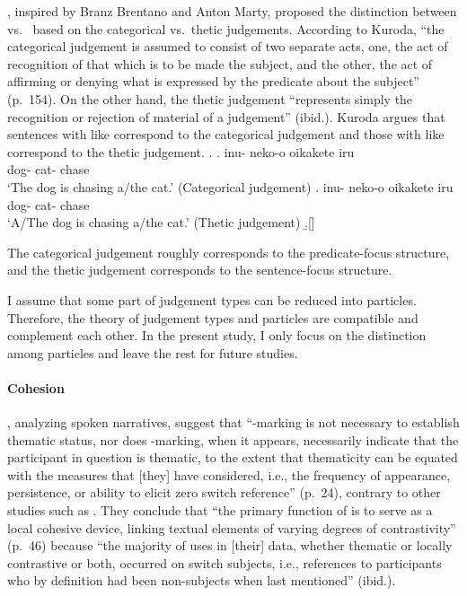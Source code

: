 ,
inspired by Branz Brentano and Anton Marty,
proposed the distinction between  vs.~
based on the categorical vs.~thetic judgements.
According to Kuroda,
``the categorical judgement is assumed to consist of two separate acts,
one, the act of recognition of that which is to be made the subject,
and the other, the act of affirming or denying what is expressed by the predicate about the subject'' (p.~154).
On the other hand,
the thetic judgement ``represents simply the recognition or rejection of material of a judgement'' (ibid.).
Kuroda argues that
sentences with  like \Next[a] correspond to the categorical judgement and
those with  like \Next[b] correspond to the thetic judgement.
%
\ex.
 \ag. inu- neko-o oikakete iru \\
      dog- cat- chase  \\
      `The dog is chasing a/the cat.'
      \hfill{(Categorical judgement)}
 \bg. inu- neko-o oikakete iru \\
      dog- cat- chase  \\
      `A/The dog is chasing a/the cat.'
      \hfill{(Thetic judgement)}
 \b.[] \hfill{\cite[161]{kuroda72}}

The categorical judgement roughly corresponds to the predicate-focus structure, and
the thetic judgement corresponds to the sentence-focus structure.

I assume that some part of judgement types can be reduced into particles.
Therefore, the theory of judgement types and particles are compatible and complement each other.
In the present study,
I only focus on the distinction among particles
and leave the rest for future studies.

\paragraph{Cohesion}

,
analyzing spoken narratives, suggest that
``-marking is not necessary to establish thematic status, nor does -marking, when it appears, necessarily indicate that the participant in question is thematic, to the extent that
thematicity can be equated with the measures that [they] have considered,
i.e., the frequency of appearance, persistence, or ability to elicit zero switch reference'' (p.~24),
contrary to other studies such as .
They conclude that
``the primary function of  is to serve as a local cohesive device,
linking textual elements of varying degrees of contrastivity'' (p.~46)
because ``the majority of  uses in [their] data,
whether thematic or locally contrastive or both,
occurred on switch subjects,
i.e., references to participants who by definition had been non-subjects when last mentioned'' (ibid.).

